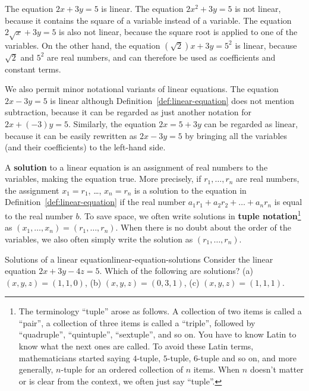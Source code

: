 \begin{solution}
  The equation $2x+3y=5$ is linear. The equation $2x^2+3y=5$ is not
  linear, because it contains the square of a variable instead of a
  variable.  The equation $2\sqrt{x} + 3y = 5$ is also not linear,
  because the square root is applied to one of the variables. On the
  other hand, the equation $(\sqrt{2}) x + 3y = 5^2$ is linear,
  because $\sqrt{2}$ and $5^2$ are real numbers, and can
  therefore be used as coefficients and constant terms.
\end{solution}
  
We also permit minor notational variants of linear equations. The
equation $2x-3y=5$ is linear although
Definition~\ref{def:linear-equation} does not mention subtraction,
because it can be regarded as just another notation for
$2x+(-3)y = 5$. Similarly, the equation $2x=5+3y$ can be regarded as
linear, because it can be easily rewritten as $2x-3y=5$ by bringing
all the variables (and their coefficients) to the left-hand side.

A \textbf{solution} to a linear
equation is an assignment of real numbers to the variables, making the
equation true. More precisely, if $r_1,\ldots,r_n$ are real numbers,
the assignment $x_1=r_1$, \ldots, $x_n=r_n$ is a solution to the
equation in Definition~\ref{def:linear-equation} if the real number
$a_1r_1 + a_2r_2 + \ldots + a_nr_n$ is equal to the real number
$b$. To save space, we often write solutions in \textbf{tuple
  notation}\footnote{The terminology ``tuple'' arose as
  follows. A collection of two items is called a ``pair'', a
  collection of three items is called a ``triple'', followed by
  ``quadruple'', ``quintuple'', ``sextuple'', and so on. You have to
  know Latin to know what the next ones are called. To avoid these
  Latin terms, mathematicians started saying $4$-tuple, $5$-tuple,
  $6$-tuple and so on, and more generally, $n$-tuple for an ordered
  collection of $n$ items. When $n$ doesn't matter or is clear from
  the context, we often just say ``tuple''.}  as
$(x_1,\ldots,x_n) = (r_1,\ldots,r_n)$. When there is no doubt about
the order of the variables, we also often simply write the solution as
$(r_1,\ldots,r_n)$.

\begin{example}{Solutions of a linear equation}{linear-equation-solutions}
  Consider the linear equation $2x+3y-4z=5$. Which of the following
  are solutions? (a) $(x,y,z)=(1,1,0)$, (b) $(x,y,z)=(0,3,1)$, (c)
  $(x,y,z)=(1,1,1)$.
\end{example}

